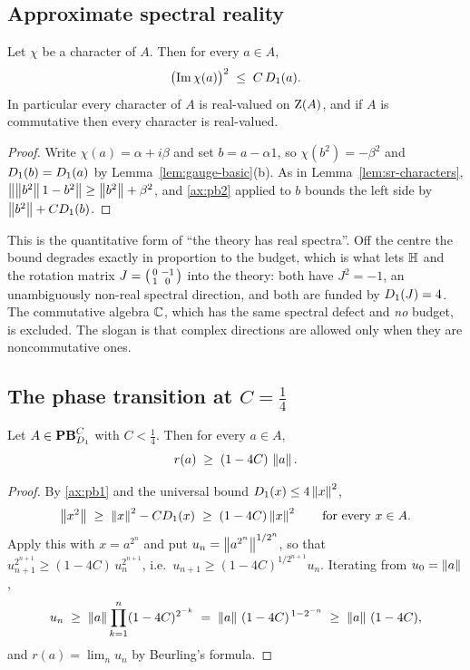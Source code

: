 \subsection{Approximate spectral reality}

\begin{theorem}\label{thm:approx-real}
Let $\chi$ be a character of $A$.  Then for every $a\in A$,
\[
  \bigl(\operatorname{Im}\chi(a)\bigr)^2\;\le\;C\,D_1(a).
\]
In particular every character of $A$ is real-valued on $\operatorname{Z}(A)$, and if $A$ is
commutative then every character is real-valued.
\end{theorem}

\begin{proof}
Write $\chi(a)=\alpha+i\beta$ and set $b=a-\alpha1$, so $\chi(b^2)=-\beta^2$ and
$D_1(b)=D_1(a)$ by Lemma~\ref{lem:gauge-basic}(b).  As in
Lemma~\ref{lem:sr-characters},
$\bigl\lVert\left\lVert b^2\right\rVert1-b^2\bigr\rVert\ge\left\lVert b^2\right\rVert+\beta^2$, and
\eqref{ax:pb2} applied to $b$ bounds the left side by
$\left\lVert b^2\right\rVert+CD_1(b)$.
\end{proof}

\begin{remark}
This is the quantitative form of ``the theory has real spectra''.  Off the
centre the bound degrades exactly in proportion to the budget, which is what
lets $\mathbb{H}$ and the rotation matrix $J=\begin{psmallmatrix}0&-1\\1&0\end{psmallmatrix}$
into the theory: both have $J^2=-1$, an unambiguously non-real spectral
direction, and both are funded by $D_1(J)=4$.  The commutative algebra
$\mathbb{C}$, which has the same spectral defect and \emph{no} budget, is excluded.
The slogan is that complex directions are allowed only when they are
noncommutative ones.
\end{remark}

\subsection{The phase transition at $C=\tfrac14$}

\begin{theorem}\label{thm:normaloid}
Let $A\in\mathbf{PB}^C_{D_1}$ with $C<\tfrac14$.  Then for every $a\in A$,
\[
  r(a)\;\ge\;(1-4C)\,\left\lVert a\right\rVert.
\]
\end{theorem}

\begin{proof}
By \eqref{ax:pb1} and the universal bound $D_1(x)\le4\left\lVert x\right\rVert^2$,
\[
  \left\lVert x^2\right\rVert\;\ge\;\left\lVert x\right\rVert^2-CD_1(x)\;\ge\;(1-4C)\left\lVert x\right\rVert^2
  \qquad\text{for every } x\in A .
\]
Apply this with $x=a^{2^n}$ and put $u_n=\left\lVert a^{2^n}\right\rVert^{1/2^n}$, so that
$u_{n+1}^{2^{n+1}}\ge(1-4C)\,u_n^{2^{n+1}}$, i.e.\
$u_{n+1}\ge(1-4C)^{1/2^{n+1}}u_n$.  Iterating from $u_0=\left\lVert a\right\rVert$,
\[
  u_n\;\ge\;\left\lVert a\right\rVert\prod_{k=1}^{n}(1-4C)^{2^{-k}}
  \;=\;\left\lVert a\right\rVert\,(1-4C)^{\,1-2^{-n}}\;\ge\;\left\lVert a\right\rVert\,(1-4C),
\]
and $r(a)=\lim_n u_n$ by Beurling's formula.
\end{proof}

